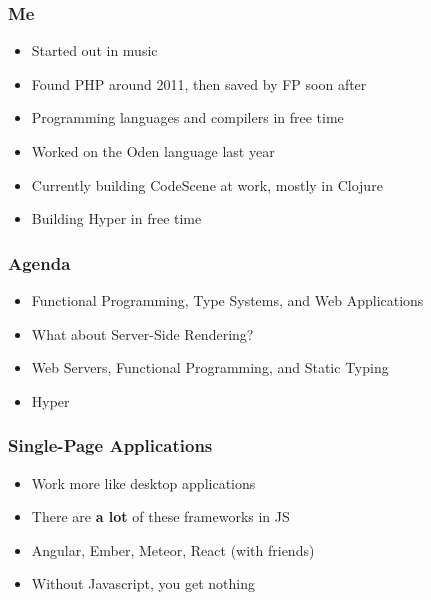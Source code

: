 \begin{frame}
  \titlepage
\end{frame}

\begin{frame}
  \frametitle{Me}
  \begin{itemize}
    \pause
    \item<+-> Started out in music
    \item<+-> Found PHP around 2011, then saved by FP soon after
    \item<+-> Programming languages and compilers in free time
    \item<+-> Worked on the Oden language last year
    \item<+-> Currently building CodeScene at work, mostly in Clojure
    \item<+-> Building Hyper in free time
  \end{itemize}
\end{frame}

\begin{frame}
  \frametitle{Agenda}
  \begin{itemize}
    \pause
    \item<+-> Functional Programming, Type Systems, and Web Applications
    \item<+-> What about Server-Side Rendering?
    \item<+-> Web Servers, Functional Programming, and Static Typing
    \item<+-> Hyper
  \end{itemize}
\end{frame}

\begin{frame}
\end{frame}

\begin{frame}
  \frametitle{Single-Page Applications}
  \begin{itemize}
    \pause
    \item<+-> Work more like desktop applications
    \item<+-> There are \textbf{a lot} of these frameworks in JS
    \item<+-> Angular, Ember, Meteor, React (with friends)
    \item<+-> Without Javascript, you get nothing
  \end{itemize}
\end{frame}

